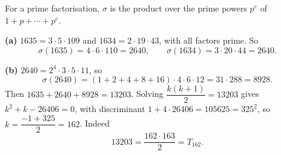 For a prime factorisation, $\sigma$ is the product over the prime powers $p^e$ of $1+p+\cdots+p^e$.

\textbf{(a)} $1635=3\cdot5\cdot109$ and $1634=2\cdot19\cdot43$, with all factors prime. So
\[\sigma(1635)=4\cdot6\cdot110=2640,\qquad\sigma(1634)=3\cdot20\cdot44=2640.\]

\textbf{(b)} $2640=2^4\cdot3\cdot5\cdot11$, so
\[\sigma(2640)=(1+2+4+8+16)\cdot4\cdot6\cdot12=31\cdot288=8928.\]
Then $1635+2640+8928=13203$. Solving $\dfrac{k(k+1)}{2}=13203$ gives $k^2+k-26406=0$, with discriminant $1+4\cdot26406=105625=325^2$, so $k=\dfrac{-1+325}{2}=162$. Indeed
\[13203=\dfrac{162\cdot163}{2}=\boxed{T_{162}}.\]
